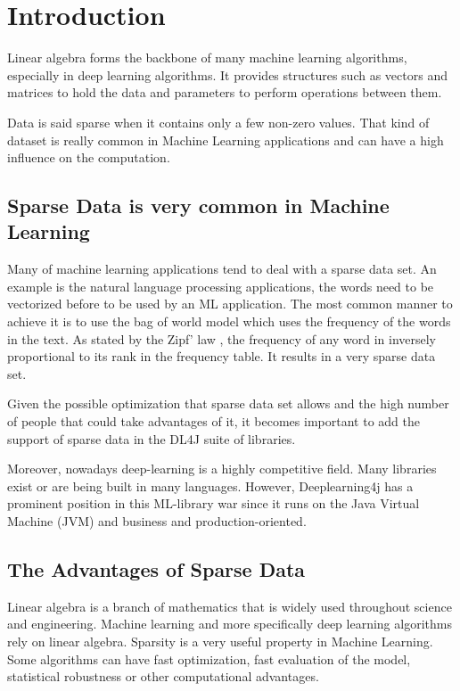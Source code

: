 \chapter{Introduction}


Linear algebra forms the backbone of many machine learning algorithms, especially in deep learning algorithms. It provides structures such as vectors and matrices to hold the data and parameters to perform operations between them. 

Data is said sparse when it contains only a few non-zero values. That kind of dataset is really common in Machine Learning applications and can have a high influence on the computation.  

\section{Sparse Data is very common in Machine Learning}

Many of machine learning applications tend to deal with a sparse data set. An example is the natural language processing applications, the words need to be vectorized before to be used by an ML application. The most common manner to achieve it is to use the bag of world model which uses the frequency of the words in the text. As stated by the Zipf' law \cite{Zipf}, the frequency of any word in inversely proportional to its rank in the frequency table. It results in a very sparse data set.

Given the possible optimization that sparse data set allows and the high number of people that could take advantages of it, it becomes important to add the support of sparse data in the DL4J suite of libraries. 

Moreover, nowadays deep-learning is a highly competitive field. Many libraries exist or are being built in many languages. However, Deeplearning4j has a prominent position in this ML-library war since it runs on the Java Virtual Machine (JVM) and business and production-oriented.



\section{The Advantages of Sparse Data}
Linear algebra is a branch of mathematics that is widely used throughout science and engineering. Machine learning and more specifically deep learning algorithms rely on linear algebra. Sparsity is a very useful property in Machine Learning. Some algorithms can have fast optimization, fast evaluation of the model, statistical robustness or other computational advantages.


